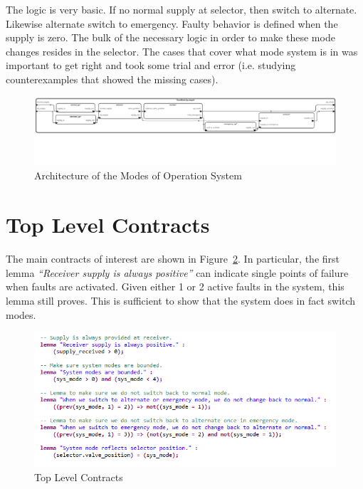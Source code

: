\documentclass{article}
\begin{document}
The logic is very basic. If no normal supply at selector, then switch to alternate. Likewise alternate switch to emergency. Faulty behavior is defined when the supply is zero. The bulk of the necessary logic in order to make these mode changes resides in the selector. The cases that cover what mode system is in was important to get right and took some trial and error (i.e. studying counterexamples that showed the missing cases).

\begin{figure}[h]
\begin{center}
\includegraphics[width=1.2\textwidth]{images/modes_structure} 
\caption{Architecture of the Modes of Operation System}
\label{fig:modes2}
\end{center}
\end{figure}

\section{Top Level Contracts}
The main contracts of interest are shown in Figure~\ref{fig:lemmas}. In particular, the first lemma \textit{``Receiver supply is always positive''} can indicate single points of failure when faults are activated. Given either 1 or 2 active faults in the system, this lemma still proves. This is sufficient to show that the system does in fact switch modes. 

\begin{figure}[h]
\begin{center}
\includegraphics[width=1.2\textwidth]{images/lemmas} 
\caption{Top Level Contracts}
\label{fig:lemmas}
\end{center}
\end{figure}
\end{document}
